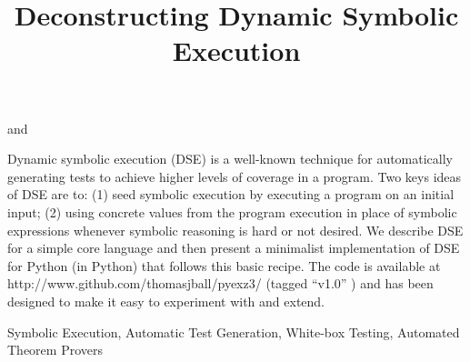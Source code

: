 \documentclass{IOS-Book-Article}
\begin{document}
\begin{frontmatter}              %
\title{Deconstructing Dynamic Symbolic Execution}
\author[A]{ }
and 
\author[B]{ }

\address[A]{Microsoft Research}
\address[B]{Charles University}\begin{mdDiv}[class={abstract},elem={abstract},data-line={39}]%
\begin{mdP}[data-line={40}]%
{}Dynamic symbolic execution (DSE) is a well-known technique
for automatically generating tests to achieve higher levels
of coverage in a program. Two keys ideas of DSE are
to: (1) seed symbolic execution by executing a program on an
initial input; (2) using concrete values from the program
execution in place of symbolic expressions whenever symbolic
reasoning is hard or not desired. We describe
DSE for a simple core language and then present
a minimalist implementation of DSE for Python (in Python) 
that follows this basic recipe. The code is available 
at http://www.github.com/thomasjball/pyexz3/ (tagged %
{}{\textquotedblleft}v1.0{\textquotedblright}%
{}) 
and has been designed to make it easy to experiment with and
extend.%
\end{mdP}%
\end{mdDiv}%
\begin{keyword}
Symbolic Execution, Automatic Test Generation, White-box Testing, Automated 
Theorem Provers
\end{keyword}
\end{frontmatter}
\thispagestyle{empty}
\pagestyle{empty}%
\end{document}
